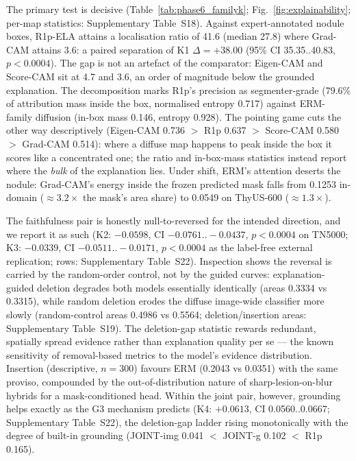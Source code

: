 \documentclass[jimh,article,submit,moreauthors,pdftex]{Definitions/tsp}
\begin{document}
The primary test is decisive (Table~\ref{tab:phase6_familyk};
Fig.~\ref{fig:explainability}; per-map statistics: Supplementary
Table~S18). Against expert-annotated nodule boxes, R1p-ELA attains a
localisation ratio of 41.6 (median 27.8) where Grad-CAM attains 3.6: a
paired separation of K1 $\Delta = +38.00$ (95\% CI 35.35..40.83,
$p{<}0.0004$). The gap is not an artefact of the comparator: Eigen-CAM
and Score-CAM sit at 4.7 and 3.6, an order of magnitude below the
grounded explanation. The decomposition marks R1p's precision as
segmenter-grade (79.6\% of attribution mass inside the box, normalised
entropy 0.717) against ERM-family diffusion (in-box mass 0.146,
entropy 0.928). The pointing game cuts the other way descriptively
(Eigen-CAM 0.736 $>$ R1p 0.637 $>$ Score-CAM 0.580 $>$ Grad-CAM 0.514):
where a diffuse map happens to peak inside the box it scores like a
concentrated one; the ratio and in-box-mass statistics instead report
where the \emph{bulk} of the explanation lies. Under shift, ERM's
attention deserts the nodule: Grad-CAM's energy inside the frozen
predicted mask falls from 0.1253 in-domain (${\approx}3.2\times$ the
mask's area share) to 0.0549 on ThyUS-600 (${\approx}1.3\times$).

The faithfulness pair is honestly null-to-reversed for the intended
direction, and we report it as such (K2: $-0.0598$, CI
$-0.0761..-0.0437$, $p{<}0.0004$ on TN5000; K3: $-0.0339$, CI
$-0.0511..-0.0171$, $p{<}0.0004$ as the label-free external
replication; rows: Supplementary Table~S22). Inspection shows the
reversal is carried by the random-order control, not by the guided
curves: explanation-guided deletion degrades
both models essentially identically (areas 0.3334 vs 0.3315), while
random deletion erodes the diffuse image-wide classifier more slowly
(random-control areas 0.4986 vs 0.5564; deletion/insertion areas:
Supplementary Table~S19). The deletion-gap statistic rewards redundant, spatially spread evidence
rather than explanation quality per se --- the known sensitivity of
removal-based metrics to the model's evidence distribution.
Insertion (descriptive, $n{=}300$) favours ERM (0.2043 vs 0.0351) with
the same proviso, compounded by the out-of-distribution nature of
sharp-lesion-on-blur hybrids for a mask-conditioned head. Within the
joint pair, however, grounding helps exactly as the G3 mechanism
predicts (K4: $+0.0613$, CI 0.0560..0.0667; Supplementary Table~S22),
the deletion-gap ladder rising monotonically with the degree of
built-in grounding (JOINT-img 0.041 $<$ JOINT-g 0.102 $<$ R1p 0.165).
\end{document}
